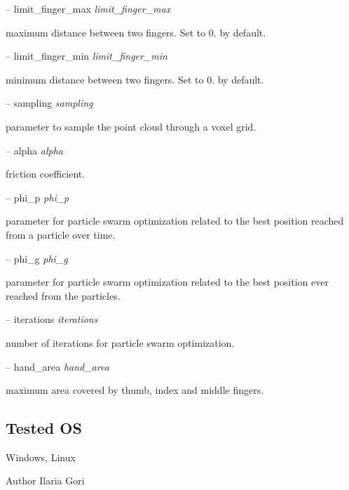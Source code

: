 -- limit\+\_\+finger\+\_\+max {\itshape limit\+\_\+finger\+\_\+max} 
\begin{DoxyItemize}
\item maximum distance between two fingers. Set to 0. by default.
\end{DoxyItemize}

-- limit\+\_\+finger\+\_\+min {\itshape limit\+\_\+finger\+\_\+min} 
\begin{DoxyItemize}
\item minimum distance between two fingers. Set to 0. by default.
\end{DoxyItemize}

-- sampling {\itshape sampling} 
\begin{DoxyItemize}
\item parameter to sample the point cloud through a voxel grid.
\end{DoxyItemize}

-- alpha {\itshape alpha} 
\begin{DoxyItemize}
\item friction coefficient.
\end{DoxyItemize}

-- phi\+\_\+p {\itshape phi\+\_\+p} 
\begin{DoxyItemize}
\item parameter for particle swarm optimization related to the best position reached from a particle over time.
\end{DoxyItemize}

-- phi\+\_\+g {\itshape phi\+\_\+g} 
\begin{DoxyItemize}
\item parameter for particle swarm optimization related to the best position ever reached from the particles.
\end{DoxyItemize}

-- iterations {\itshape iterations} 
\begin{DoxyItemize}
\item number of iterations for particle swarm optimization.
\end{DoxyItemize}

-- hand\+\_\+area {\itshape hand\+\_\+area} 
\begin{DoxyItemize}
\item maximum area covered by thumb, index and middle fingers.
\end{DoxyItemize}\hypertarget{group__handIKModule_tested_os_sec}{}\subsection{Tested O\+S}\label{group__handIKModule_tested_os_sec}
Windows, Linux

\begin{DoxyAuthor}{Author}
Ilaria Gori 
\end{DoxyAuthor}
